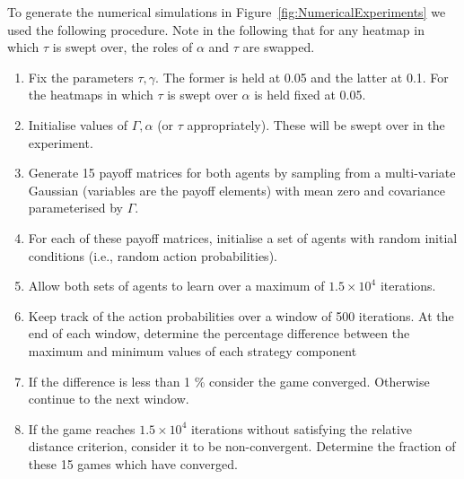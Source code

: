 \documentclass[sigconf]{aamas}
\newcommand\fb[1]{\textcolor{blue}{FB: #1}}
\begin{document}
To generate the numerical simulations in Figure~\ref{fig:NumericalExperiments} we used the
following procedure. Note in the following that for any heatmap in which $\tau$ is swept over, the roles of $\alpha$ and $\tau$ are swapped.
\begin{enumerate}
   \item Fix the parameters $\tau, \gamma$. The former is held at 0.05 and the latter at 0.1. For the heatmaps in which $\tau$ is swept over $\alpha$ is held fixed at 0.05.
   \item Initialise values of $\Gamma, \alpha$ (or $\tau$ appropriately). These will be swept over in the experiment.
\item Generate 15 payoff matrices for both agents by sampling from a multi-variate Gaussian 
(variables are the payoff elements) with mean zero and covariance parameterised by $\Gamma$.
\item For each of these payoff matrices, initialise a set of agents with random initial conditions (i.e., random action probabilities).
\item Allow both sets of agents to learn over a maximum of $1.5 \times 10^4$ iterations.
\item Keep track of the action probabilities over a window of 500 iterations. At the end of each window, determine the percentage difference between the maximum and minimum values of each strategy component
\item If the difference is less than 1 \% consider the game converged. Otherwise continue to the next window.
\item If the game reaches $1.5 \times 10^4$ iterations without satisfying the relative distance criterion, consider it to be non-convergent. Determine the fraction of these 15 games which have converged.


\end{enumerate}
   
\end{document}
